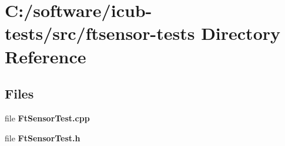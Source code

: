 \section{C\+:/software/icub-\/tests/src/ftsensor-\/tests Directory Reference}
\label{dir_58c9f48d72e7737305eca65c820f5d4c}
\subsection*{Files}
\begin{DoxyCompactItemize}
\item 
file {\bfseries Ft\+Sensor\+Test.\+cpp}
\item 
file {\bfseries Ft\+Sensor\+Test.\+h}
\end{DoxyCompactItemize}
